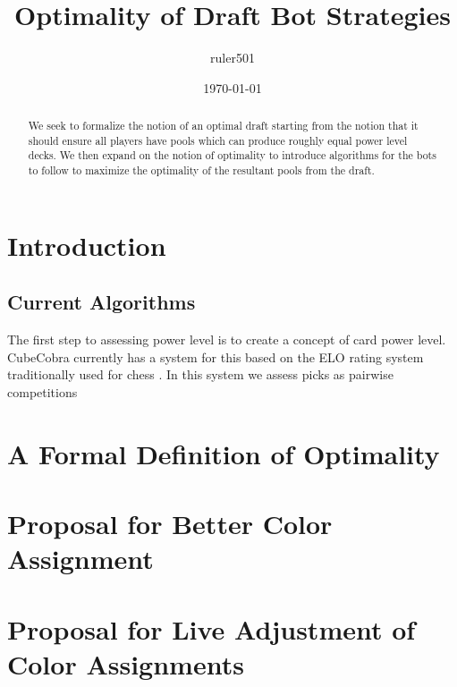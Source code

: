 \documentclass[oneside,12pt]{amsart}
\title{Optimality of Draft Bot Strategies}
\author{ruler501}
\date{\today}
\begin{document}
\begin{abstract}
    We seek to formalize the notion of an optimal draft starting from the
    notion that it should ensure all players have pools which can produce
    roughly equal power level decks. We then expand on the notion of
    optimality to introduce algorithms for the bots to follow to maximize
    the optimality of the resultant pools from the draft.
\end{abstract}

\maketitle

\tableofcontents

\section{Introduction}

    \subsection{Current Algorithms}
        The first step to assessing power level is to create a concept of card power
        level. CubeCobra currently has a system for this based on the ELO rating
        system traditionally used for chess . In this system we
        assess picks as pairwise competitions

\section{A Formal Definition of Optimality}

\section{Proposal for Better Color Assignment}

\section{Proposal for Live Adjustment of Color Assignments}



\end{document}

